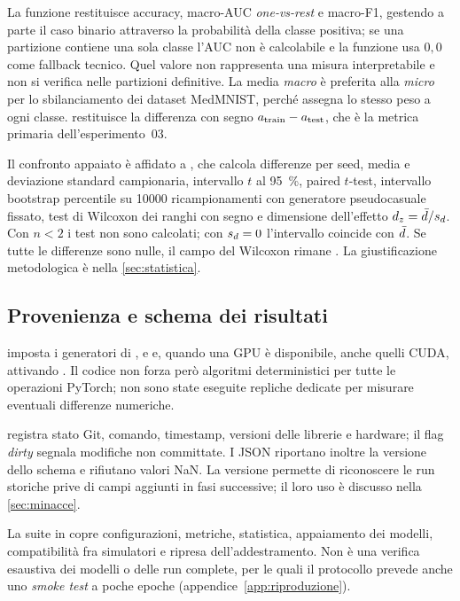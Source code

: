 La funzione 
restituisce accuracy, macro-AUC \emph{one-vs-rest} e macro-F1, gestendo a parte il
caso binario attraverso la probabilità della classe positiva; se una partizione
contiene una sola classe l'AUC non è calcolabile e la funzione usa $0{,}0$ come
fallback tecnico. Quel valore non rappresenta una misura interpretabile e non si
verifica nelle partizioni definitive. La media \emph{macro} è preferita alla
\emph{micro} per lo sbilanciamento dei dataset MedMNIST, perché assegna lo stesso
peso a ogni classe.
 restituisce la differenza con segno
$a_{\mathrm{train}} - a_{\mathrm{test}}$, che è la metrica primaria dell'esperimento~03.

Il confronto appaiato è affidato a , che calcola
differenze per seed, media e deviazione standard campionaria, intervallo $t$ al
\SI{95}{\percent}, paired $t$-test, intervallo bootstrap percentile su
\num{10000} ricampionamenti con generatore pseudocasuale fissato, test di Wilcoxon
dei ranghi con segno e dimensione dell'effetto $d_z = \bar{d}/s_d$. Con $n<2$ i
test non sono calcolati; con $s_d=0$ l'intervallo coincide con $\bar{d}$. Se tutte
le differenze sono nulle, il campo del Wilcoxon rimane . La
giustificazione metodologica è nella
\cref{sec:statistica}.

\subsection{Provenienza e schema dei risultati}
\label{sec:riproducibilita}

 imposta i generatori di ,  e
 e, quando una GPU è disponibile, anche quelli CUDA, attivando
. Il codice non forza però algoritmi deterministici per
tutte le operazioni PyTorch; non sono state eseguite repliche dedicate per
misurare eventuali differenze numeriche.

 registra stato Git, comando, timestamp, versioni
delle librerie e hardware; il flag \emph{dirty} segnala modifiche non committate.
I JSON riportano inoltre la versione dello schema e rifiutano valori NaN. La
versione permette di riconoscere le run storiche prive di campi aggiunti in fasi
successive; il loro uso è discusso nella \cref{sec:minacce}.

La suite in  copre configurazioni, metriche, statistica, appaiamento
dei modelli, compatibilità fra simulatori e ripresa dell'addestramento. Non è una
verifica esaustiva dei modelli o delle run complete, per le quali il protocollo
prevede anche uno \emph{smoke test} a poche epoche
(appendice~\ref{app:riproduzione}).

